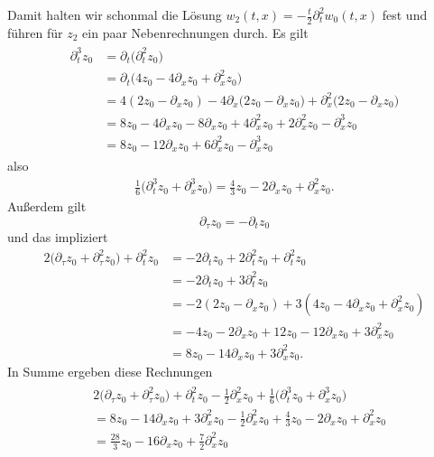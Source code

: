 Damit halten wir schonmal die Lösung $w_2(t,x) = -\frac{t}{2} \partial^2_t w_0(t,x)$ fest und führen für $z_2$ ein paar Nebenrechnungen durch.
Es gilt
\begin{align}
\begin{split}
\partial^3_t z_0 &= \partial_t \bigl( \partial^2_t z_0 \bigr)\\
&= \partial_t \bigl( 4 z_0 - 4 \partial_x z_0 + \partial^2_x z_0 \bigr)\\
&= 4 ( 2z_0 - \partial_x z_0 ) - 4 \partial_x \bigl( 2z_0 - \partial_x z_0 \bigr) + \partial^2_x \bigl( 2 z_0 - \partial_x z_0 \bigr)\\
&= 8z_0 - 4 \partial_x z_0 - 8 \partial_x z_0 + 4 \partial^2_x z_0 + 2 \partial^2_x z_0 - \partial^3_x z_0\\
&= 8 z_0 - 12 \partial_x z_0 + 6 \partial^2_x z_0 - \partial^3_x z_0
\end{split}
\end{align}
also
\begin{align}
\frac{1}{6} \bigl(\partial^3_t z_0 + \partial^3_x z_0 \bigr)
= \frac{4}{3} z_0 - 2 \partial_x z_0 + \partial^2_x z_0.
\end{align}
Außerdem gilt
\[ \partial_\tau z_0 = - \partial_t z_0 \]
und das impliziert
\begin{align*}
2 \bigl( \partial_\tau z_0 + \partial^2_\tau z_0 \bigr) + \partial^2_t z_0
&= - 2 \partial_t z_0 + 2 \partial^2_t z_0 + \partial^2_t z_0\\
&= - 2 \partial_t z_0 + 3 \partial^2_t z_0 \\
&= - 2 (2 z_0 - \partial_x z_0) + 3 (4 z_0 - 4 \partial_x z_0 + \partial^2_x z_0)\\
&= - 4 z_0 - 2 \partial_x z_0 + 12 z_0 - 12 \partial_x z_0 + 3 \partial^2_x z_0\\
&= 8 z_0 - 14 \partial_x z_0 + 3 \partial^2_x z_0.
\end{align*}
In Summe ergeben diese Rechnungen
\begin{align}
\begin{split}
&2 \bigl( \partial_\tau z_0 + \partial^2_\tau z_0 \bigr) + \partial^2_t z_0 - \frac{1}{2} \partial^2_x z_0 + \frac{1}{6} \bigl(\partial^3_t z_0 + \partial^3_x z_0 \bigr)\\
&= 8 z_0 - 14 \partial_x z_0 + 3 \partial^2_x z_0 - \frac{1}{2} \partial^2_x z_0 + \frac{4}{3} z_0 - 2 \partial_x z_0 + \partial^2_x z_0\\
&= \frac{28}{3} z_0 - 16 \partial_x z_0 + \frac{7}{2} \partial^2_x z_0
\end{split}
\end{align}
